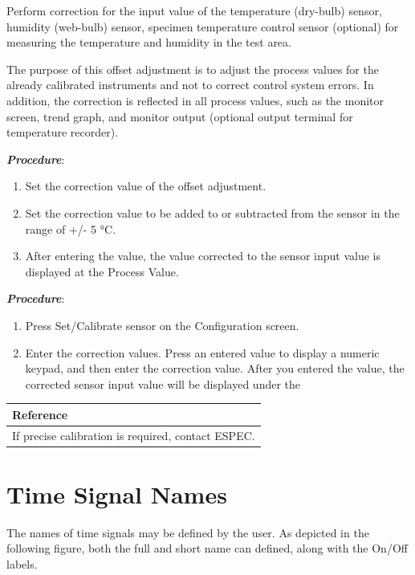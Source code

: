 Perform correction for the input value of the temperature (dry-bulb)
sensor, humidity (web-bulb) sensor, specimen temperature control sensor
(optional) for measuring the temperature and humidity in the test area.

The purpose of this offset adjustment is to adjust the process values
for the already calibrated instruments and not to correct control system
errors. In addition, the correction is reflected in all process values,
such as the monitor screen, trend graph, and monitor output (optional
output terminal for temperature recorder).

\textbf{\emph{Procedure}}:

\begin{enumerate}
\def\labelenumi{\arabic{enumi}.}
\tightlist
\item
  Set the correction value of the offset adjustment.
\item
  Set the correction value to be added to or subtracted from the sensor
  in the range of +/- 5 °C.
\item
  After entering the value, the value corrected to the sensor input
  value is displayed at the Process Value.
\end{enumerate}

\textbf{\emph{Procedure}}:

\begin{enumerate}
\def\labelenumi{\arabic{enumi}.}
\tightlist
\item
  Press Set/Calibrate sensor on the Configuration screen.
\item
  Enter the correction values. Press an entered value to display a
  numeric keypad, and then enter the correction value. After you entered
  the value, the corrected sensor input value will be displayed under
  the
\end{enumerate}

\begin{longtable}[]{@{}|l|@{}}
\toprule
\textbf{Reference}\tabularnewline
\midrule
\endhead
If precise calibration is required, contact ESPEC.\tabularnewline
\bottomrule
\end{longtable}


\section{Time Signal Names}

The names of time signals may be defined by the user. As depicted in the
following figure, both the full and short name can defined, along with
the On/Off labels.

